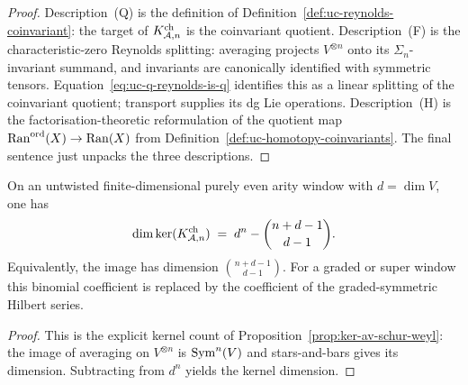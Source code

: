 \begin{proof}
Description~(Q) is the definition of
Definition~\ref{def:uc-reynolds-coinvariant}: the target of
$K_{\mathcal{A},n}^{\mathrm{ch}}$ is the coinvariant quotient.
Description~(F) is the characteristic-zero Reynolds splitting:
averaging projects $V^{\otimes n}$ onto its $\Sigma_n$-invariant
summand, and invariants are canonically identified with symmetric
tensors.  Equation~\eqref{eq:uc-q-reynolds-is-q} identifies this as a
linear splitting of the coinvariant quotient; transport supplies its
dg Lie operations. Description~(H) is the factorisation-theoretic reformulation
of the quotient map $\operatorname{Ran}^{\mathrm{ord}}(X)\to \operatorname{Ran}(X)$ from
Definition~\ref{def:uc-homotopy-coinvariants}. The final sentence just
unpacks the three descriptions.
\end{proof}

\begin{proposition}
\label{prop:uc-kernel-dimension}
\ClaimStatusProvedHere
On an untwisted finite-dimensional purely even arity window with
$d=\dim V$, one
has
\[
 \dim\ker(K_{\mathcal{A},n}^{\mathrm{ch}})
 \;=\;
 d^n-\binom{n+d-1}{d-1}.
\]
Equivalently, the image has dimension $\binom{n+d-1}{d-1}$.
For a graded or super window this binomial coefficient is replaced by
the coefficient of the graded-symmetric Hilbert series.
\end{proposition}

\begin{proof}
This is the explicit kernel count of
Proposition~\ref{prop:ker-av-schur-weyl}: the image of averaging on
$V^{\otimes n}$ is $\operatorname{Sym}^n(V)$ and stars-and-bars gives its
dimension. Subtracting from $d^n$ yields the kernel dimension.
\end{proof}

